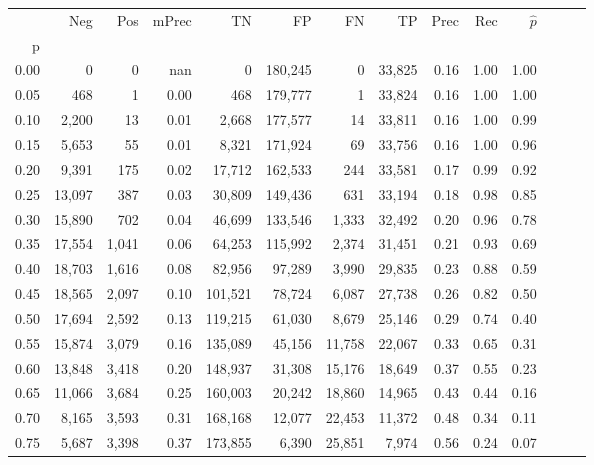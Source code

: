 \begin{tabular}{rrrrrrrrrrrrrr}
\toprule
{} &     Neg &    Pos & mPrec &       TN &       FP &      FN &      TP &  Prec &   Rec & $\hat{p}$ \\
p    &         &        &       &          &          &         &         &       &       &           \\
\midrule
0.00 &       0 &      0 &   nan &        0 &  180,245 &       0 &  33,825 &  0.16 &  1.00 &      1.00 \\
0.05 &     468 &      1 &  0.00 &      468 &  179,777 &       1 &  33,824 &  0.16 &  1.00 &      1.00 \\
0.10 &   2,200 &     13 &  0.01 &    2,668 &  177,577 &      14 &  33,811 &  0.16 &  1.00 &      0.99 \\
0.15 &   5,653 &     55 &  0.01 &    8,321 &  171,924 &      69 &  33,756 &  0.16 &  1.00 &      0.96 \\
0.20 &   9,391 &    175 &  0.02 &   17,712 &  162,533 &     244 &  33,581 &  0.17 &  0.99 &      0.92 \\
0.25 &  13,097 &    387 &  0.03 &   30,809 &  149,436 &     631 &  33,194 &  0.18 &  0.98 &      0.85 \\
0.30 &  15,890 &    702 &  0.04 &   46,699 &  133,546 &   1,333 &  32,492 &  0.20 &  0.96 &      0.78 \\
0.35 &  17,554 &  1,041 &  0.06 &   64,253 &  115,992 &   2,374 &  31,451 &  0.21 &  0.93 &      0.69 \\
0.40 &  18,703 &  1,616 &  0.08 &   82,956 &   97,289 &   3,990 &  29,835 &  0.23 &  0.88 &      0.59 \\
0.45 &  18,565 &  2,097 &  0.10 &  101,521 &   78,724 &   6,087 &  27,738 &  0.26 &  0.82 &      0.50 \\
0.50 &  17,694 &  2,592 &  0.13 &  119,215 &   61,030 &   8,679 &  25,146 &  0.29 &  0.74 &      0.40 \\
0.55 &  15,874 &  3,079 &  0.16 &  135,089 &   45,156 &  11,758 &  22,067 &  0.33 &  0.65 &      0.31 \\
0.60 &  13,848 &  3,418 &  0.20 &  148,937 &   31,308 &  15,176 &  18,649 &  0.37 &  0.55 &      0.23 \\
0.65 &  11,066 &  3,684 &  0.25 &  160,003 &   20,242 &  18,860 &  14,965 &  0.43 &  0.44 &      0.16 \\
0.70 &   8,165 &  3,593 &  0.31 &  168,168 &   12,077 &  22,453 &  11,372 &  0.48 &  0.34 &      0.11 \\
0.75 &   5,687 &  3,398 &  0.37 &  173,855 &    6,390 &  25,851 &   7,974 &  0.56 &  0.24 &      0.07 \\

\end{tabular}
